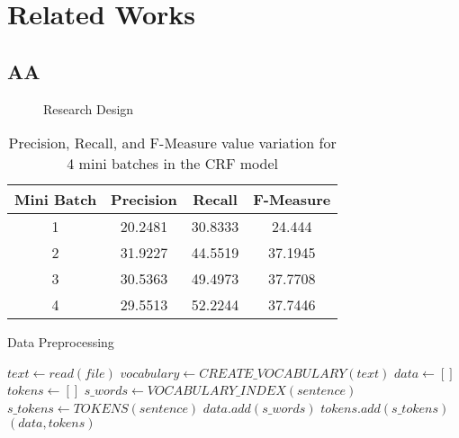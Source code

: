 \section{Related Works}
		\subsection{AA}
			\blindtext\cite{O2,M2}
			\begin{figure*}
		    \centering
		    \def\svgwidth{\columnwidth}
			
				\caption{Research Design}
			\label{Ch3Fig1:ResearchDesign}
		\end{figure*}
		
		\begin{table*}
		\centering
		\begin{tabular}[c]{|c|c|c|c|}
			\hline
				Mini Batch & Precision & Recall & F-Measure \\
			\hline
				1 & 20.2481 & 30.8333 & 24.444 \\
			\hline
				2 & 31.9227 & 44.5519 & 37.1945 \\
			\hline
				3 & 30.5363 & 49.4973 & 37.7708 \\
			\hline
				4 & 29.5513 & 52.2244 & 37.7446 \\
			\hline
			
		\end{tabular}
		\caption{Precision, Recall, and F-Measure value variation for 4 mini batches in the CRF model}
		\label{Ch5Tab1:CRFResults}
	\end{table*}
	
	\begin{algorithm*}
	\caption{Data Preprocessing}
	\label{alg:DataPreprocessing}
	\begin{algorithmic}[1]
		\State $text \gets read(file)$
		\State $vocabulary \gets CREATE\_VOCABULARY(text)$
		\State $data \gets []$
		\State $tokens \gets []$
		   \State $s\_words \gets VOCABULARY\_INDEX(sentence)$
		   \State $s\_tokens \gets TOKENS(sentence)$
		   \State $data.add(s\_words)$
		   \State $tokens.add(s\_tokens)$
		\EndFor
		\State\Return $(data, tokens)$
		\EndProcedure
	\end{algorithmic}
	\end{algorithm*}
